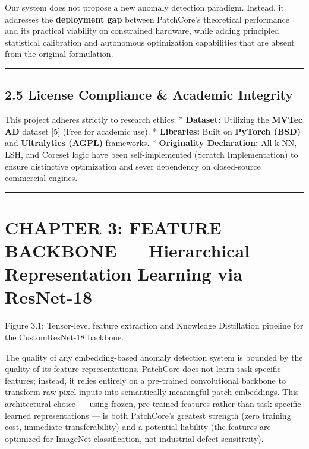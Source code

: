 Our system does not propose a new anomaly detection paradigm. Instead, it addresses the \textbf{deployment gap} between PatchCore's theoretical performance and its practical viability on constrained hardware, while adding principled statistical calibration and autonomous optimization capabilities that are absent from the original formulation.

\begin{center}\rule{0.5\linewidth}{0.5pt}\end{center}

\subsection{2.5 License Compliance \& Academic Integrity}\label{license-compliance-academic-integrity}

This project adheres strictly to research ethics: * \textbf{Dataset:} Utilizing the \textbf{MVTec AD} dataset {[}5{]} (Free for academic use). * \textbf{Libraries:} Built on \textbf{PyTorch (BSD)} and \textbf{Ultralytics (AGPL)} frameworks. * \textbf{Originality Declaration:} All k-NN, LSH, and Coreset logic have been self-implemented (Scratch Implementation) to ensure distinctive optimization and sever dependency on closed-source commercial engines.

\begin{center}\rule{0.5\linewidth}{0.5pt}\end{center}

\section{CHAPTER 3: FEATURE BACKBONE --- Hierarchical Representation Learning via ResNet-18}\label{chapter-3-feature-backbone-hierarchical-representation-learning-via-resnet-18}

Figure 3.1: Tensor-level feature extraction and Knowledge Distillation pipeline for the CustomResNet-18 backbone.

The quality of any embedding-based anomaly detection system is bounded by the quality of its feature representations. PatchCore does not learn task-specific features; instead, it relies entirely on a pre-trained convolutional backbone to transform raw pixel inputs into semantically meaningful patch embeddings. This architectural choice --- using frozen, pre-trained features rather than task-specific learned representations --- is both PatchCore's greatest strength (zero training cost, immediate transferability) and a potential liability (the features are optimized for ImageNet classification, not industrial defect sensitivity).

